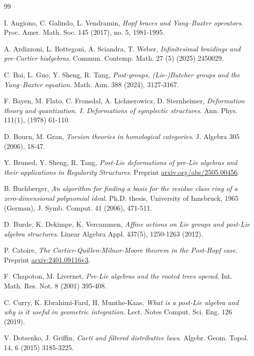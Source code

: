 \documentclass[10pt]{article}
\theoremstyle{definition}
\begin{document}
\begin{thebibliography}{99}

I. Angiono, C. Galindo, L. Vendramin, 
\emph{Hopf braces and Yang--Baxter operators}. Proc. Amer. Math. Soc. 145 (2017), no. 5, 1981-1995.

A. Ardizzoni, L. Bottegoni, A. Sciandra, T. Weber, \emph{Infinitesimal braidings and pre-Cartier bialgebras}. 
Commun. Contemp. Math. 27 (5) (2025) 2450029.


C. Bai, L. Guo, Y. Sheng, R. Tang, 
\emph{Post-groups, (Lie-)Butcher groups and the Yang--Baxter equation}. Math. Ann. 388 (2024), 3127-3167.

F. Bayen, M. Flato, C. Fronsdal, A. Lichnerowicz, D. Sternheimer, \emph{Deformation theory and quantization. I. Deformations of symplectic structures}.
Ann. Phys. 111(1), (1978) 61-110.


D. Bourn, M. Gran, 
\emph{Torsion theories in homological categories}. 
J. Algebra 305 (2006), 18-47.

Y. Bruned, Y. Sheng, R. Tang, \emph{Post-Lie deformations of pre-Lie algebras and their applications in Regularity Structures}. Preprint \hyperlink{https://arxiv.org/abs/2505.00456}{arxiv.org/abs/2505.00456}.

B. Buchberger, \emph{An algorithm for finding a basis for the residue class ring of a zero-dimensional polynomial ideal}. Ph.D. thesis, University of Innsbruck, 1965 (German), J. Symb. Comput. 41 (2006), 471-511.

D. Burde, K.  Dekimpe, K. Vercammen, 
\emph{Affine actions on Lie groups and post-Lie algebra structures}.  Linear Algebra Appl. 437(5), 1250-1263 (2012).

P. Catoire,
\emph{The Cartier-Quillen-Milnor-Moore theorem in the Post-Hopf case}. Preprint \hyperlink{https://arxiv.org/abs/2401.09116}{arxiv:2401.09116v3}.

F. Chapoton, M. Livernet, \emph{Pre-Lie algebras and the rooted trees operad}. Int. Math. Res. Not. 8 (2001) 395-408.

C. Curry, K. Ebrahimi-Fard, H. Munthe-Kaas,
\emph{What is a post-Lie algebra and why is it useful in geometric integration}.
Lect. Notes Comput. Sci. Eng. 126 (2019).

V. Dotsenko, J. Griffin, \emph{Cacti and filtered distributive laws}. Algebr. Geom. Topol. 14, 6 (2015) 3185-3225.


\end{thebibliography}
\end{document}
